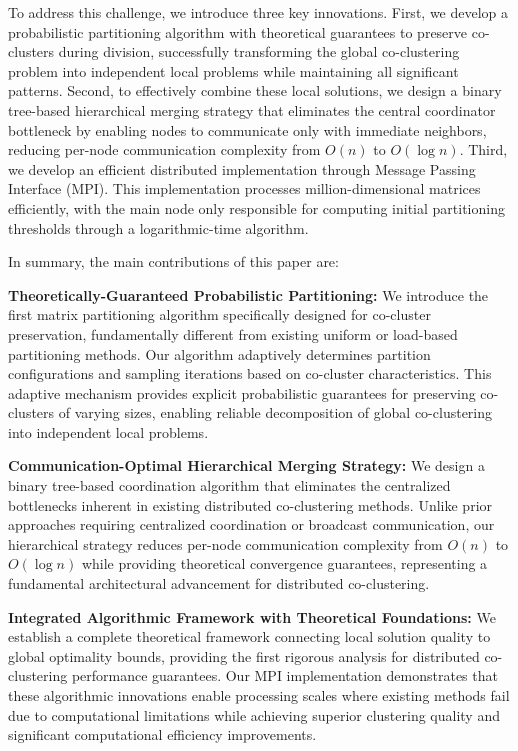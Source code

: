 \documentclass[journal]{IEEEtran}
\begin{document}
To address this challenge, we introduce three key innovations. First, we develop a probabilistic partitioning algorithm with theoretical guarantees to preserve co-clusters during division, successfully transforming the global co-clustering problem into independent local problems while maintaining all significant patterns. Second, to effectively combine these local solutions, we design a binary tree-based hierarchical merging strategy that eliminates the central coordinator bottleneck by enabling nodes to communicate only with immediate neighbors, reducing per-node communication complexity from $O(n)$ to $O(\log n)$. Third, we develop an efficient distributed implementation through Message Passing Interface (MPI). This implementation processes million-dimensional matrices efficiently, with the main node only responsible for computing initial partitioning thresholds through a logarithmic-time algorithm.

In summary, the main contributions of this paper are:
\begin{enumerate}
    {\color{blue}
    \item \textbf{Theoretically-Guaranteed Probabilistic Partitioning:} We introduce the first matrix partitioning algorithm specifically designed for co-cluster preservation, fundamentally different from existing uniform or load-based partitioning methods. Our algorithm adaptively determines partition configurations and sampling iterations based on co-cluster characteristics. This adaptive mechanism provides explicit probabilistic guarantees for preserving co-clusters of varying sizes, enabling reliable decomposition of global co-clustering into independent local problems.
          }

    \item \textbf{Communication-Optimal Hierarchical Merging Strategy:} We design a binary tree-based coordination algorithm that eliminates the centralized bottlenecks inherent in existing distributed co-clustering methods. Unlike prior approaches requiring centralized coordination or broadcast communication, our hierarchical strategy reduces per-node communication complexity from $O(n)$ to $O(\log n)$ while providing theoretical convergence guarantees, representing a fundamental architectural advancement for distributed co-clustering.

    \item \textbf{Integrated Algorithmic Framework with Theoretical Foundations:} We establish a complete theoretical framework connecting local solution quality to global optimality bounds, providing the first rigorous analysis for distributed co-clustering performance guarantees. Our MPI implementation demonstrates that these algorithmic innovations enable processing scales where existing methods fail due to computational limitations while achieving superior clustering quality and significant computational efficiency improvements.
\end{enumerate}
\end{document}
